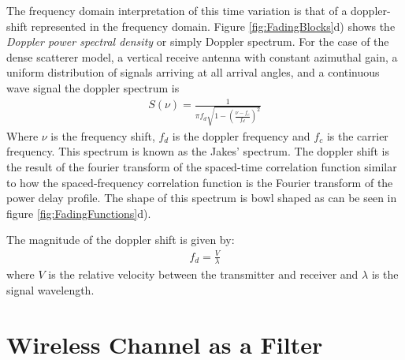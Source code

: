 The frequency domain interpretation of %
this time variation is that of a doppler-shift %
represented in the frequency domain. Figure %
\ref{fig:FadingBlocks}d) shows the \emph{%
Doppler power spectral density} or simply %
Doppler spectrum. For the case of the dense %
scatterer model, a vertical receive antenna with %
constant azimuthal gain, a uniform distribution of %
signals arriving at all arrival angles, and a %
continuous wave signal the doppler spectrum is %
\cite{Clarke68}
\begin{align}
	S(\nu) = \frac{1}{\pi f_{d} \sqrt{1 - %
		(\frac{\nu - f_{c}}{f_{d}})^{2}}}
	\label{eq:JakesSpectrum}
\end{align}
Where $\nu$ is the frequency shift, $f_{d}$ is the %
doppler frequency and $f_{c}$ is the carrier frequency. %
This spectrum is known as the Jakes' spectrum\cite{Iskander}. %
The doppler shift is the result of the fourier transform %
of the spaced-time correlation function similar to how %
the spaced-frequency correlation function is the %
Fourier transform of the power delay profile. The %
shape of this spectrum is bowl shaped as can be seen in %
figure \ref{fig:FadingFunctions}d).

The magnitude of the doppler shift is given by:
\begin{align}
	f_{d} = \frac{V}{\lambda}
\end{align}
where $V$ is the relative velocity between the %
transmitter and receiver and $\lambda$ is the signal %
wavelength.

\section{Wireless Channel as a Filter}

